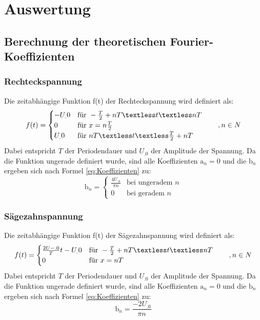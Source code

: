 \section{Auswertung}
\label{sec:Auswertung}

\subsection{Berechnung der theoretischen Fourier-Koeffizienten}
\subsubsection{Rechteckspannung}
Die zeitabhängige Funktion f(t) der Rechteckspannung wird definiert als:
\[
f(t)=
	\begin{cases}
     -U_.0 & \text{für } -\frac{T}{2}+nT \textless t \textless nT\\
     0  & \text{für } x=n\frac{T}{2} \\
     U_.0  & \text{für } nT \textless t \textless \frac{T}{2}+nT 
   	\end{cases}
\hspace{2em},n\in N
\]
Dabei entspricht $T$ der Periodendauer und $U_.0$ der Amplitude der Spannung. Da die Funktion ungerade definiert wurde, sind alle Koeffizienten $\mathrm{a}_n=0$ und die $\mathrm{b}_n$ ergeben sich nach Formel \eqref{eq:Koeffizienten} zu:
\begin{equation}
\mathrm{b}_n =
	\begin{cases} 
	\frac{4U_.0}{\pi n} & \text{bei ungeradem }n\\
	0 & \text{bei geradem }n
	\end{cases}
\label{eq:KoeffRechteck}
\end{equation}

\subsubsection{Sägezahnspannung}
Die zeitabhängige Funktion f(t) der Sägezahnspannung wird definiert als:
\[
f(t)=
	\begin{cases}
     \frac{2U-.0}{T}t-U_.0 & \text{für } -\frac{T}{2}+nT \textless t \textless nT\\
     0  & \text{für } x=nT
   	\end{cases}
\hspace{2em},n\in N
\]
Dabei entspricht $T$ der Periodendauer und $U_.0$ der Amplitude der Spannung. Da die Funktion ungerade definiert wurde, sind alle Koeffizienten $\mathrm{a}_n=0$ und die $\mathrm{b}_n$ ergeben sich nach Formel \eqref{eq:Koeffizienten} zu:
\begin{equation}
\mathrm{b}_n = \frac{-2U_.0}{\pi n} 
\label{eq:KoeffSägezahn}
\end{equation}

